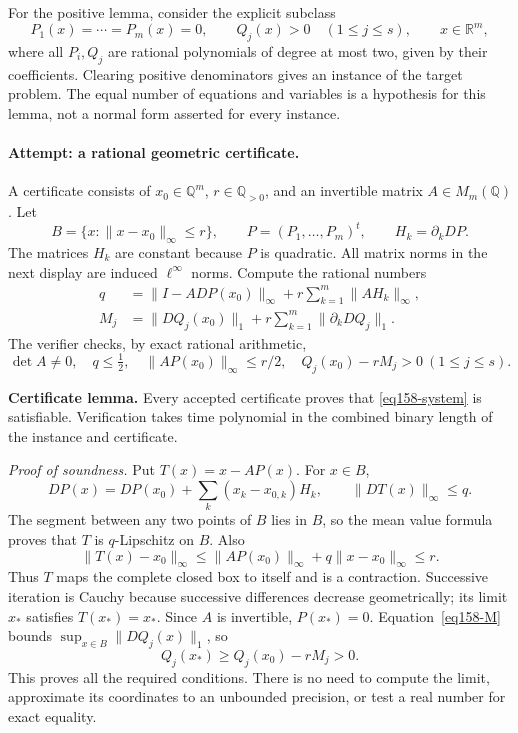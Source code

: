 \documentclass[11pt,a4paper]{article}
\newcommand{\Q}{\mathbb{Q}}
\newcommand{\R}{\mathbb{R}}
\numberwithin{equation}{section}
\begin{document}
For the positive lemma, consider the explicit subclass
\begin{equation}\label{eq158-system}
 P_1(x)=\cdots=P_m(x)=0,\qquad Q_j(x)>0\quad(1\le j\le s),
 \qquad x\in\R^m,
\end{equation}
where all $P_i,Q_j$ are rational polynomials of degree at most two, given
by their coefficients. Clearing positive denominators gives an instance
of the target problem. The equal number of equations and variables is a
hypothesis for this lemma, not a normal form asserted for every instance.

\paragraph{Attempt: a rational geometric certificate.}
A certificate consists of $x_0\in\Q^m$, $r\in\Q_{>0}$, and an invertible
matrix $A\in M_m(\Q)$. Let
\[
 B=\{x:\|x-x_0\|_\infty\le r\},\qquad P=(P_1,\ldots,P_m)^t,
 \qquad H_k=\partial_kDP.
\]
The matrices $H_k$ are constant because $P$ is quadratic. All matrix norms
in the next display are induced $\ell^\infty$ norms. Compute the rational
numbers
\begin{align}
 q&=\|I-A DP(x_0)\|_\infty+
       r\sum_{k=1}^m\|A H_k\|_\infty,\label{eq158-q}\\
 M_j&=\|DQ_j(x_0)\|_1+
       r\sum_{k=1}^m\|\partial_k DQ_j\|_1.\label{eq158-M}
\end{align}
The verifier checks, by exact rational arithmetic,
\begin{equation}\label{eq158-checks}
 \det A\ne0,\quad q\le\tfrac12,\quad
 \|A P(x_0)\|_\infty\le r/2,\quad Q_j(x_0)-rM_j>0\ (1\le j\le s).
\end{equation}

\textbf{Certificate lemma.} Every accepted certificate proves that
\eqref{eq158-system} is satisfiable. Verification takes time polynomial in
the combined binary length of the instance and certificate.

\textit{Proof of soundness.} Put $T(x)=x-A P(x)$. For $x\in B$,
\[
 DP(x)=DP(x_0)+\sum_k(x_k-x_{0,k})H_k,
 \qquad\|DT(x)\|_\infty\le q.
\]
The segment between any two points of $B$ lies in $B$, so the mean value
formula proves that $T$ is $q$-Lipschitz on $B$. Also
\[
 \|T(x)-x_0\|_\infty
 \le\|AP(x_0)\|_\infty+q\|x-x_0\|_\infty\le r.
\]
Thus $T$ maps the complete closed box to itself and is a contraction.
Successive iteration is Cauchy because successive differences decrease
geometrically; its limit $x_*$ satisfies $T(x_*)=x_*$. Since $A$ is
invertible, $P(x_*)=0$. Equation~\eqref{eq158-M} bounds
$\sup_{x\in B}\|DQ_j(x)\|_1$, so
\[
 Q_j(x_*)\ge Q_j(x_0)-rM_j>0.
\]
This proves all the required conditions. There is no need to compute the
limit, approximate its coordinates to an unbounded precision, or test a
real number for exact equality.
\end{document}
